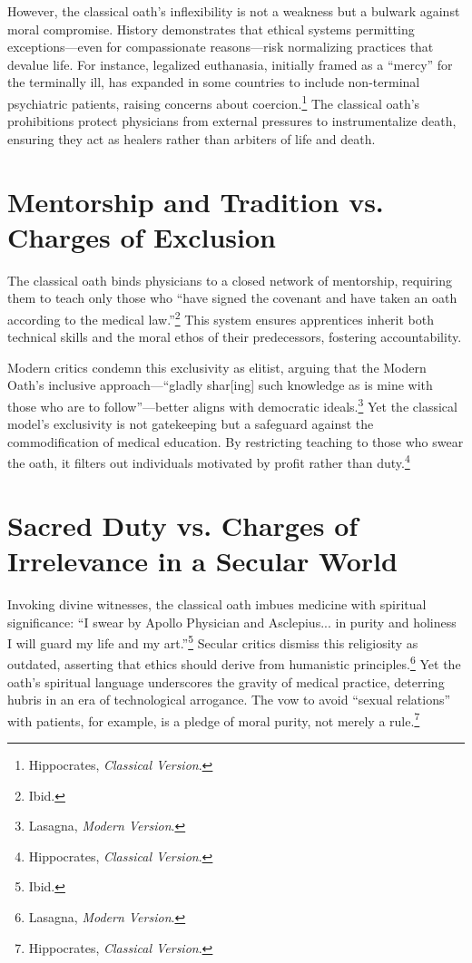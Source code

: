 \documentclass[12pt]{article}
\begin{document}
However, the classical oath’s inflexibility is not a weakness but a bulwark against moral compromise. History demonstrates that ethical systems permitting exceptions—even for compassionate reasons—risk normalizing practices that devalue life. For instance, legalized euthanasia, initially framed as a “mercy” for the terminally ill, has expanded in some countries to include non-terminal psychiatric patients, raising concerns about coercion.\footnote{Hippocrates, \textit{Classical Version}.} The classical oath’s prohibitions protect physicians from external pressures to instrumentalize death, ensuring they act as healers rather than arbiters of life and death.

\section*{Mentorship and Tradition vs. Charges of Exclusion}

The classical oath binds physicians to a closed network of mentorship, requiring them to teach only those who “have signed the covenant and have taken an oath according to the medical law.”\footnote{Ibid.} This system ensures apprentices inherit both technical skills and the moral ethos of their predecessors, fostering accountability. 

Modern critics condemn this exclusivity as elitist, arguing that the Modern Oath’s inclusive approach—“gladly shar[ing] such knowledge as is mine with those who are to follow”—better aligns with democratic ideals.\footnote{Lasagna, \textit{Modern Version}.} Yet the classical model’s exclusivity is not gatekeeping but a safeguard against the commodification of medical education. By restricting teaching to those who swear the oath, it filters out individuals motivated by profit rather than duty.\footnote{Hippocrates, \textit{Classical Version}.}

\section*{Sacred Duty vs. Charges of Irrelevance in a Secular World}

Invoking divine witnesses, the classical oath imbues medicine with spiritual significance: “I swear by Apollo Physician and Asclepius... in purity and holiness I will guard my life and my art.”\footnote{Ibid.} Secular critics dismiss this religiosity as outdated, asserting that ethics should derive from humanistic principles.\footnote{Lasagna, \textit{Modern Version}.} Yet the oath’s spiritual language underscores the gravity of medical practice, deterring hubris in an era of technological arrogance. The vow to avoid “sexual relations” with patients, for example, is a pledge of moral purity, not merely a rule.\footnote{Hippocrates, \textit{Classical Version}.}
\end{document}

